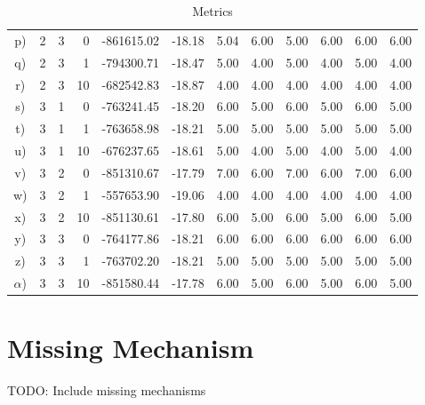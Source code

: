 \documentclass[10pt]{article} %
\begin{document}
\begin{table}[H]
\begin{tabular}{crrrrrrrrrrr}
  \hline                                           
  p) &2 &3 & 0 & -861615.02 & -18.18 & 5.04 & 6.00 & 5.00 & 6.00 & 6.00 & 6.00 \\
  q) &2 &3 & 1 & -794300.71 & -18.47 & 5.00 & 4.00 & 5.00 & 4.00 & 5.00 & 4.00 \\
  r) &2 &3 &10 & -682542.83 & -18.87 & 4.00 & 4.00 & 4.00 & 4.00 & 4.00 & 4.00 \\
  \hline\hline                                     
  s) &3 &1 & 0 & -763241.45 & -18.20 & 6.00 & 5.00 & 6.00 & 5.00 & 6.00 & 5.00 \\
  t) &3 &1 & 1 & -763658.98 & -18.21 & 5.00 & 5.00 & 5.00 & 5.00 & 5.00 & 5.00 \\
  u) &3 &1 &10 & -676237.65 & -18.61 & 5.00 & 4.00 & 5.00 & 4.00 & 5.00 & 4.00 \\
  \hline                                           
  v) &3 &2 & 0 & -851310.67 & -17.79 & 7.00 & 6.00 & 7.00 & 6.00 & 7.00 & 6.00 \\
  w) &3 &2 & 1 & -557653.90 & -19.06 & 4.00 & 4.00 & 4.00 & 4.00 & 4.00 & 4.00 \\
  x) &3 &2 &10 & -851130.61 & -17.80 & 6.00 & 5.00 & 6.00 & 5.00 & 6.00 & 5.00 \\
  \hline                                           
  y) &3 &3 & 0 & -764177.86 & -18.21 & 6.00 & 6.00 & 6.00 & 6.00 & 6.00 & 6.00 \\
  z) &3 &3 & 1 & -763702.20 & -18.21 & 5.00 & 5.00 & 5.00 & 5.00 & 5.00 & 5.00 \\
  $\alpha$) &3 &3 &10 & -851580.44 & -17.78 & 6.00 & 5.00 & 6.00 & 5.00 & 6.00 & 5.00 \\
  \hline
\end{tabular}
\caption{Metrics}
\label{tab:metrics}
\end{table}

\newpage
\section{Missing Mechanism}
TODO: Include missing mechanisms


% 
\end{document}
